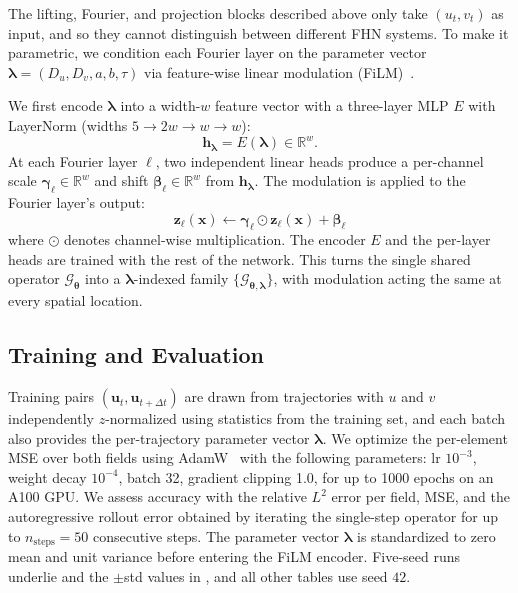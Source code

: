 \documentclass[runningheads]{llncs}
\begin{document}
The lifting, Fourier, and projection blocks described above only take $(u_t, v_t)$ as input, and so they cannot distinguish between different FHN systems. To make it parametric, we condition each Fourier layer on the parameter vector $\bm{\lambda} = (D_u, D_v, a, b, \tau)$ via feature-wise linear modulation (FiLM)~\cite{film2018}.

We first encode $\bm{\lambda}$ into a width-$w$ feature vector with a three-layer MLP $E$ with LayerNorm (widths $5 \to 2w \to w \to w$):
\begin{equation*}
    \bm{h}_{\bm{\lambda}} = E(\bm{\lambda}) \in \mathbb{R}^{w}.
\end{equation*}
At each Fourier layer $\ell$, two independent linear heads produce a per-channel scale $\bm{\gamma}_\ell \in \mathbb{R}^{w}$ and shift $\bm{\beta}_\ell \in \mathbb{R}^{w}$ from $\bm{h}_{\bm{\lambda}}$. The modulation is applied to the Fourier layer's output:
\begin{equation*}
    \bm{z}_\ell(\bm{x}) \leftarrow \bm{\gamma}_\ell \odot \bm{z}_\ell(\bm{x}) + \bm{\beta}_\ell
\end{equation*}
where $\odot$ denotes channel-wise multiplication. The encoder $E$ and the per-layer heads are trained with the rest of the network. This turns the single shared operator $\mathcal{G}_{\bm{\theta}}$ into a $\bm{\lambda}$-indexed family $\{\mathcal{G}_{\bm{\theta}, \bm{\lambda}}\}$, with modulation acting the same at every spatial location.

\subsection{Training and Evaluation}
\label{sec:training_config}

Training pairs $(\bm{u}_t, \bm{u}_{t+\Delta t})$ are drawn from trajectories with $u$ and $v$ independently $z$-normalized using statistics from the training set, and each batch also provides the per-trajectory parameter vector $\bm{\lambda}$. We optimize the per-element MSE over both fields using AdamW~\cite{loshchilov2019decoupled} with the following parameters: lr $10^{-3}$, weight decay $10^{-4}$, batch 32, gradient clipping 1.0, for up to 1000 epochs on an A100 GPU. We assess accuracy with the relative $L^2$ error per field, MSE, and the autoregressive rollout error obtained by iterating the single-step operator for up to $n_{\text{steps}} = 50$ consecutive steps. The parameter vector $\bm{\lambda}$ is standardized to zero mean and unit variance before entering the FiLM encoder. Five-seed runs underlie  and the $\pm$std values in , and all other tables use seed $42$.
\end{document}

